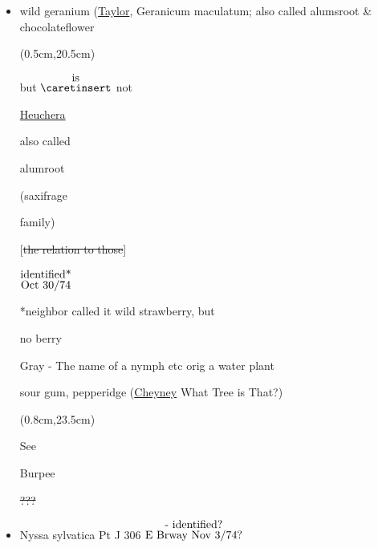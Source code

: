 \documentclass[a4paper,10pt]{article}
\begin{document}
\begin{flushleft}
\begin{itemize}
\color{blue}
\normalsize
\item wild geranium (\ul{Taylor}, Geranicum maculatum; also called alumsroot \& chocolateflower\par
\color{red}
\begin{textblock*}{3.22in}(0.5cm,20.5cm)%
    \small
    \begin{minipage}{3.22in} 
        \color{red}
        but $\stackrel{\hbox{is}}{\hbox{$\caretinsert$}}$ not\par
        \ul{Heuchera}\par
        also called\par
         alumroot\par
        (saxifrage\par
        family)
        \normalsize
  \end{minipage}%
  \end{textblock*}%
\color{blue}
[\st{the relation to those}]
{$\stackrel{\hbox{identified*}}{\hbox{Oct 30/74}}$}\par
*neighbor called it wild strawberry, but\par 
no berry\par
Gray - The name of a nymph etc orig a water plant\par 
sour gum, pepperidge \color{red} (\ul{Cheyney} What Tree is That?)
\begin{textblock*}{2in}(0.8cm,23.5cm)%
    \small
    \begin{minipage}{2in} 
        \color{red}
        See\par
        Burpee\par
        \sout{???}\par
        \normalsize
  \end{minipage}%
  \end{textblock*}%
\color{blue}
\item Nyssa sylvatica Pt J 306 {$\stackrel{\hbox{- identified?}}{\hbox{E Brway Nov 3/74?}}$}



\end{itemize}
\end{flushleft}
\end{document}
